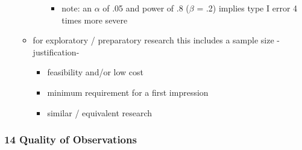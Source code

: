 \documentclass[
]{article}
\providecommand{\tightlist}{%
  \setlength{\itemsep}{0pt}\setlength{\parskip}{0pt}}
\begin{document}
\begin{itemize}
\begin{itemize}
\begin{itemize}
      \begin{itemize}
      \tightlist
      \item
        note: an \(\alpha\) of .05 and power of .8 (\(\beta\) = .2)
        implies type I error 4 times more severe
      \end{itemize}
    \end{itemize}
  \item
    for exploratory / preparatory research this includes a sample size
    -justification-

    \begin{itemize}
    \tightlist
    \item
      feasibility and/or low cost
    \item
      minimum requirement for a first impression
    \item
      similar / equivalent research
    \end{itemize}
  \end{itemize}
\end{itemize}

\hypertarget{quality-of-observations}{%
\subsubsection{14 Quality of
Observations}\label{quality-of-observations}}
\end{document}
